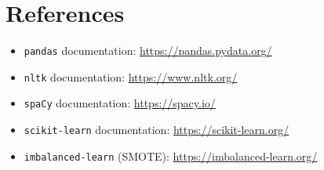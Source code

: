 \documentclass{article}
\begin{document}
\section*{References}
\begin{itemize}
    \item \texttt{pandas} documentation: \url{https://pandas.pydata.org/}
    \item \texttt{nltk} documentation: \url{https://www.nltk.org/}
    \item \texttt{spaCy} documentation: \url{https://spacy.io/}
    \item \texttt{scikit-learn} documentation: \url{https://scikit-learn.org/}
    \item \texttt{imbalanced-learn} (SMOTE): \url{https://imbalanced-learn.org/}
\end{itemize}
\end{document}
